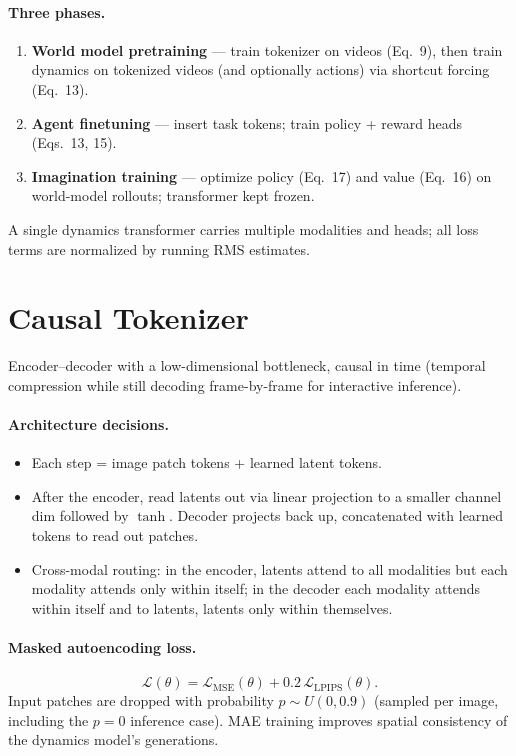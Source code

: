 \documentclass[11pt]{article}
\begin{document}
\paragraph{Three phases.}
\begin{enumerate}
  \item \textbf{World model pretraining} --- train tokenizer on videos (Eq.~9), then
    train dynamics on tokenized videos (and optionally actions) via shortcut forcing
    (Eq.~13).
  \item \textbf{Agent finetuning} --- insert task tokens; train policy + reward heads
    (Eqs.~13, 15).
  \item \textbf{Imagination training} --- optimize policy (Eq.~17) and value (Eq.~16)
    on world-model rollouts; transformer kept frozen.
\end{enumerate}
A single dynamics transformer carries multiple modalities and heads; all loss terms
are normalized by running RMS estimates.

\section{Causal Tokenizer}

Encoder--decoder with a low-dimensional bottleneck, causal in time (temporal
compression while still decoding frame-by-frame for interactive inference).

\paragraph{Architecture decisions.}
\begin{itemize}
  \item Each step = image patch tokens + learned latent tokens.
  \item After the encoder, read latents out via linear projection to a smaller channel
    dim followed by $\tanh$. Decoder projects back up, concatenated with learned tokens
    to read out patches.
  \item Cross-modal routing: in the encoder, latents attend to all modalities but each
    modality attends only within itself; in the decoder each modality attends within
    itself and to latents, latents only within themselves.
\end{itemize}

\paragraph{Masked autoencoding loss.}
\begin{equation}
  \mathcal{L}(\theta) = \mathcal{L}_{\text{MSE}}(\theta) + 0.2\,\mathcal{L}_{\text{LPIPS}}(\theta).
\end{equation}
Input patches are dropped with probability $p \sim U(0,0.9)$ (sampled per image,
including the $p=0$ inference case). MAE training improves spatial consistency of the
dynamics model's generations.
\end{document}
